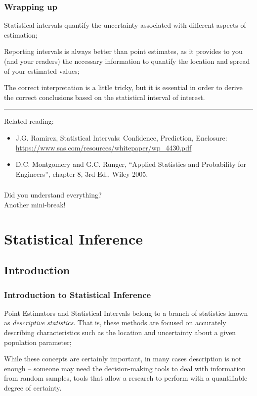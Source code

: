 \documentclass[10pt]{beamer}
\begin{document}
\begin{frame}
  \frametitle{Wrapping up} 
  Statistical intervals quantify the uncertainty associated with
  different aspects of estimation;

  \bigskip

  Reporting intervals is always better than point estimates, as it
  provides to you (and your readers) the necessary information to
  quantify the location and spread of your estimated values;

  \bigskip

  The correct interpretation is a little tricky, but it is essential
  in order to derive the correct conclusions based on the statistical
  interval of interest.

  \bigskip

  \rule{\textwidth}{0.4pt}
  {\smaller
    Related reading:
    \begin{itemize}
      \item J.G. Ramirez, Statistical Intervals: Confidence, Prediction, Enclosure:\\
        \url{https://www.sas.com/resources/whitepaper/wp_4430.pdf}
      \item D.C. Montgomery and G.C. Runger, ``Applied Statistics and
        Probability for Engineers'', chapter 8, 3rd Ed., Wiley 2005.
    \end{itemize}    
  }

\end{frame}

\begin{frame}
  \frametitle{}
  \begin{center}
    Did you understand everything?\\
    Another mini-break!
  \end{center}
\end{frame}


\section{Statistical Inference}
\subsection{Introduction}
\begin{frame}
  \frametitle{Introduction to Statistical Inference} 

  Point Estimators and Statistical Intervals belong to a branch of
  statistics known as \emph{descriptive statistics}. That is, these
  methods are focused on accurately describing characteristics such as
  the location and uncertainty about a given population parameter;

  \vfill

  While these concepts are certainly important, in many cases
  description is not enough -- someone may need the decision-making
  tools to deal with information from random samples, tools that allow
  a research to perform  with a quantifiable
  degree of certainty.
\end{frame}
\end{document}
